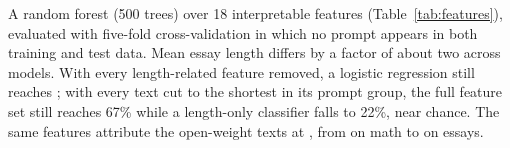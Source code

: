 A random forest (500 trees) over 18 interpretable features
(Table~\ref{tab:features}), evaluated with five-fold cross-validation in
which no prompt appears in both training and test data. Mean essay length
differs by a factor of about two across models. With every length-related
feature removed, a logistic regression still reaches
\EngineALengthFreeLR{}; with every text cut to the shortest in its prompt
group, the full feature set still reaches 67\% while a length-only
classifier falls to 22\%, near chance. The same features attribute the
open-weight texts at \OWClfPooled{}, from \OWClfMath{} on math to
\OWClfProse{} on essays.


